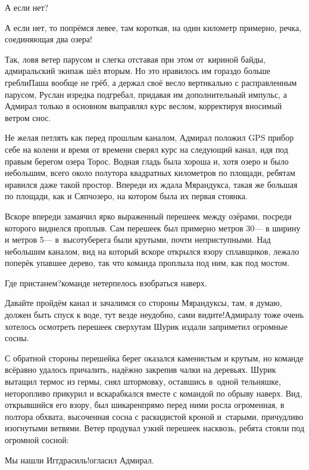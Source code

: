 \diagdash А если нет?

\diagdash А если нет, то попрёмся левее, там короткая, на один километр примерно, речка, соединяющая два озера!

Так, ловя ветер парусом и слегка отставая при этом от~кириной байды, адмиральский экипаж шёл вторым. Но это нравилось им гораздо больше гребли\mdash Паша вообще не грёб, а держал своё весло вертикально с расправленным парусом, Руслан изредка подгребал, придавая им дополнительный импульс, а Адмирал только в основном выправлял курс веслом, корректируя вносимый ветром снос.

Не желая петлять как перед прошлым каналом, Адмирал положил GPS прибор себе на колени и время от времени сверял курс на следующий канал, идя под правым берегом озера Торос. Водная гладь была хороша и, хотя озеро и было небольшим, всего около полутора квадратных километров по площади, ребятам нравился даже такой простор. Впереди их ждала Мярандукса, такая же большая по площади, как и Сяпчозеро, на котором была их первая стоянка. 

Вскоре впереди замаячил ярко выраженный перешеек между озёрами, посреди которого виднелся проплыв. Сам перешеек был примерно метров 30\thinspace\nobreakdash--- в ширину и метров 5\thinspace\nobreakdash--- в~высоту\mdash берега были крутыми, почти неприступными. Над небольшим каналом, вид на который вскоре открылся взору сплавщиков, лежало поперёк упавшее дерево, так что команда проплыла под ним, как под мостом.

\diagdash Где пристанем?\mdash команде нетерпелось взобраться наверх.

\diagdash Давайте пройдём канал и зачалимся со стороны Мярандуксы, там, я думаю, должен быть спуск к воде, тут везде неудобно, сами видите!\mdash Адмиралу тоже очень хотелось осмотреть перешеек сверху\mdash там Шурик издали заприметил огромные сосны.

С обратной стороны перешейка берег оказался каменистым и крутым, но команде всё\sdash равно удалось причалить, надёжно закрепив чалки на деревьях. Шурик вытащил термос из гермы, снял штормовку, оставшись в~одной тельняшке, неторопливо прикурил и вскарабкался вместе с командой по обрыву наверх. Вид, открывшийся его взору, был шикарен\mdash прямо перед ними росла огроменная, в полтора обхвата, высоченная сосна с раскидистой кроной и~старыми, причудливо изогнутыми ветвями. Ветер продувал узкий перешеек насквозь, ребята стояли под огромной сосной:

\diagdash Мы нашли Иггдрасиль!\mdash огласил Адмирал.

